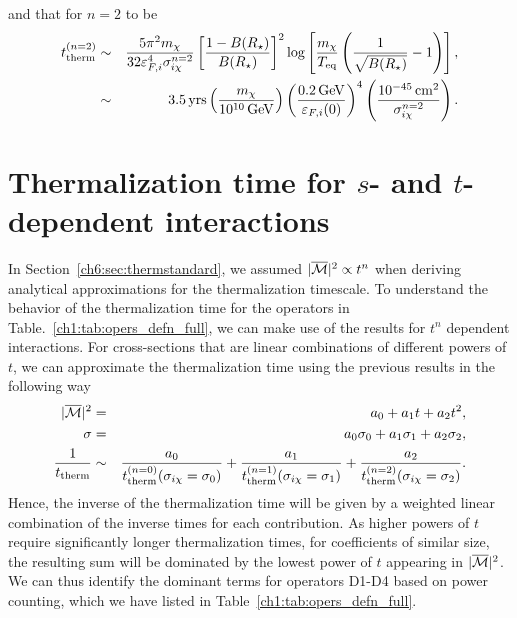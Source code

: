 and that for $n=2$ to be
\begin{eqnarray}
    t_{\rm therm}^{(n=2)} &\sim& \frac{5 \pi^2 m_\chi}{ 32 \varepsilon_{F,i}^4\sigma_{i\chi}^{n=2}} \left[\frac{1-B(R_\star)}{B(R_\star)}\right]^2 \log\left[\frac{m_\chi}{T_{\rm eq}}\left(\frac{1}{\sqrt{B(R_\star)}}-1\right)\right],\\
    &\sim& 3.5 {\rm \,yrs} \left( \frac{m_\chi}{10^{10} {\rm \,GeV}}\right) \left(\frac{0.2{\rm \,GeV}}{\varepsilon_{F,i}(0)}\right)^{4}\left(\frac{10^{-45}{\rm \,cm}^2}{\sigma_{i\chi}^{n=2}}\right). 
\end{eqnarray}







\section{Thermalization time for $s$- and $t$-dependent interactions}
\label{app:sec:sdeptherm}


In Section~\ref{ch6:sec:thermstandard}, we assumed $|\overline{\mathcal M}|^2\propto t^n$ when deriving analytical approximations for the thermalization timescale. To understand the behavior of the thermalization time for the operators in Table.~\ref{ch1:tab:opers_defn_full}, we can make use of the results for $t^n$ dependent interactions. For cross-sections that are linear combinations of different powers of $t$, we can approximate the thermalization time using the previous results in the following way
\begin{eqnarray}
|\overline{\mathcal M}|^2 &=& a_0 + a_1 t + a_2 t^2,\\
\sigma &=& a_0\sigma_0 + a_1 \sigma_1 + a_2 \sigma_2,\\
\frac{1}{t_{\rm therm}} &\sim& \frac{a_0}{ t_{\rm therm}^{(n=0)}(\sigma_{i\chi}=\sigma_0)} + \frac{a_1} {t_{\rm therm}^{(n=1)}(\sigma_{i\chi}=\sigma_1)} 
 + \frac{a_2}{  t_{\rm therm}^{(n=2)}(\sigma_{i\chi}=\sigma_2)}. 
\label{app:eq:ttherm_weighted}
\end{eqnarray}
Hence, the inverse of the thermalization time will be given by a weighted linear combination of the inverse times for each contribution. As higher powers of $t$ require significantly longer thermalization times, for coefficients of similar size, the resulting sum will be dominated by the lowest power of $t$ appearing in  $|\overline{\mathcal M}|^2$.  We can thus identify the dominant terms for operators D1-D4  based on power counting, which we have listed in Table~\ref{ch1:tab:opers_defn_full}.

